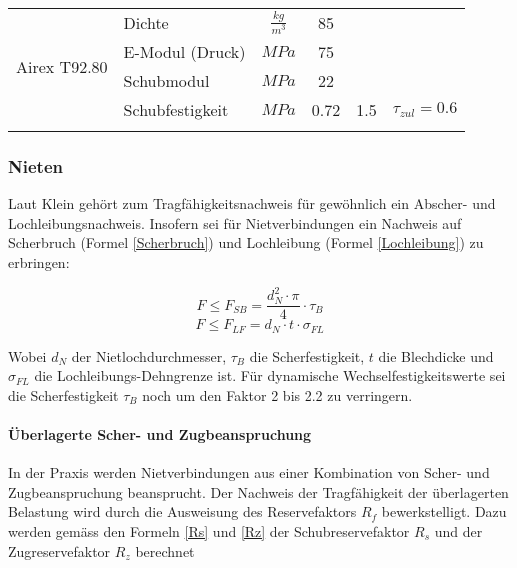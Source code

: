 \begin{table}
\begin{tabular}{llcccc}
        \hline
        \multirow{4}{*}{Airex T92.80} & Dichte            & $\frac{kg}{m^3}$  & 85      & &\\
                                      & E-Modul (Druck)   & $MPa$             & 75      & &\\
                                      & Schubmodul        & $MPa$             & 22      & &\\
                                      & Schubfestigkeit   & $MPa$             & 0.72    & 1.5 & $\tau_{zul} = 0.6$\\

      \thickhline
      \end{tabular}
    \end{table}


  \subsubsection{Nieten}
    Laut Klein \cite{klein} gehört zum Tragfähigkeitsnachweis für gewöhnlich ein Abscher- und Lochleibungsnachweis. Insofern sei für Nietverbindungen ein Nachweis auf Scherbruch (Formel \ref{Scherbruch}) und Lochleibung (Formel \ref{Lochleibung}) zu erbringen:
    \begin{multicols}{2}
      \begin{equation}
        \label{Scherbruch}
        F \leq F_{SB} = \frac{d_N^2 \cdot \pi}{4}\cdot \tau_B
      \end{equation}\break
      \begin{equation}
        \label{Lochleibung}
        F \leq F_{LF} = d_N \cdot t \cdot \sigma_{FL}
      \end{equation}
    \end{multicols}
    Wobei $d_N$ der Nietlochdurchmesser, $\tau_B$ die Scherfestigkeit, $t$ die Blechdicke und $\sigma_{FL}$ die Lochleibungs-Dehngrenze ist. Für dynamische Wechselfestigkeitswerte sei die Scherfestigkeit $\tau_B$ noch um den Faktor 2 bis 2.2 zu verringern.

    \paragraph{Überlagerte Scher- und Zugbeanspruchung}
    In der Praxis werden Nietverbindungen aus einer Kombination von Scher- und Zugbeanspruchung beansprucht. Der Nachweis der Tragfähigkeit der überlagerten Belastung wird durch die Ausweisung des Reservefaktors $R_f$ bewerkstelligt. Dazu werden gemäss den Formeln \ref{Rs} und \ref{Rz} der Schubreservefaktor $R_s$ und der Zugreservefaktor $R_z$ berechnet

